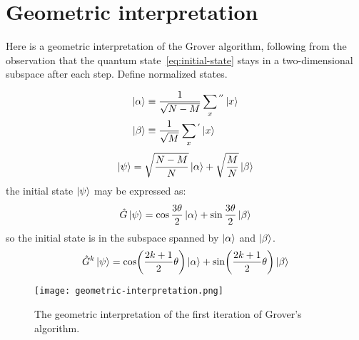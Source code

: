 \section{Geometric interpretation}
Here is a geometric interpretation of the Grover algorithm, following from the observation that the quantum state~\ref{eq:initial-state} stays in a two-dimensional subspace after each step. Define normalized states.

\begin{equation*}
\begin{split}
 \ket{\alpha} &\equiv \frac{1}{\sqrt{N-M}} \sum_{x}{}^{''} \ket{x} \\
 \ket{\beta} &\equiv \frac{1}{\sqrt{M}} \sum_{x}{}^{'} \ket{x}
\end{split}
\end{equation*}
\begin{equation*}
    \ket{\psi} = \sqrt{\frac{N-M}{N}} \ket{\alpha} + \sqrt{\frac{M}{N}} \ket{\beta}
\end{equation*}
the initial state $\ket{\psi}$ may be expressed as:
\begin{equation*}
    \hat{G}\ket{\psi} = \cos\frac{3\theta}{2} \ket{\alpha} + \sin\frac{3\theta}{2} \ket{\beta}
\end{equation*}
so the initial state is in the subspace spanned by $\ket{\alpha}$ and $\ket{\beta}$.
\begin{equation*}
    \hat{G}^{k}\ket{\psi} = \cos\biggl(\frac{2k+1}{2}\theta\biggr) \ket{\alpha} + \sin\biggl(\frac{2k+1}{2}\theta\biggr) \ket{\beta}
\end{equation*}

\begin{figure}
\texttt{[image: geometric-interpretation.png]}
\centering
\caption{The geometric interpretation of the first iteration of Grover's algorithm.}
\end{figure}


